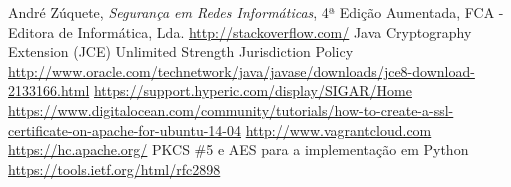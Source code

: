\documentclass[pdftex,12pt,a4paper]{report}
\begin{document}
\renewcommand{\bibname}{Referências}

\begin{thebibliography}{} 
	 André Zúquete, \textit{Segurança em Redes Informáticas}, 4ª Edição Aumentada, FCA - Editora de Informática, Lda.
	 \url{http://stackoverflow.com/}
	 Java Cryptography Extension (JCE) Unlimited Strength Jurisdiction Policy \url{http://www.oracle.com/technetwork/java/javase/downloads/jce8-download-2133166.html}
	 \url{https://support.hyperic.com/display/SIGAR/Home}
	 \url{https://www.digitalocean.com/community/tutorials/how-to-create-a-ssl-certificate-on-apache-for-ubuntu-14-04}
	 \url{http://www.vagrantcloud.com}
	 \url{https://hc.apache.org/}
	 PKCS {\#}5 e AES para a implementação em Python \url{https://tools.ietf.org/html/rfc2898}
\end{thebibliography}
\end{document}

